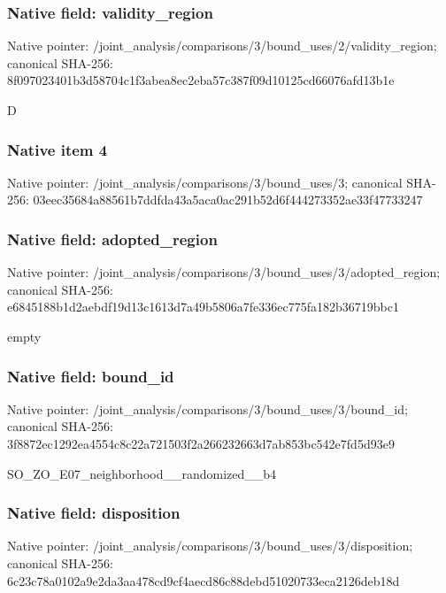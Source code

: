 \documentclass[10pt,a4paper]{article}
\begin{document}
\subsubsection{Native field: validity\_\allowbreak{}region}
Native pointer: /joint\_\allowbreak{}analysis/comparisons/3/bound\_\allowbreak{}uses/2/validity\_\allowbreak{}region; canonical SHA-256: 8f097023401b3d58704c1f3abea8ec2eba57c387f09d10125cd66076afd13b1e

\begingroup\raggedright\sloppy D\par\endgroup

\subsubsection{Native item 4}
Native pointer: /joint\_\allowbreak{}analysis/comparisons/3/bound\_\allowbreak{}uses/3; canonical SHA-256: 03eec35684a88561b7ddfda43a5aca0ac291b52d6f444273352ae33f47733247

\subsubsection{Native field: adopted\_\allowbreak{}region}
Native pointer: /joint\_\allowbreak{}analysis/comparisons/3/bound\_\allowbreak{}uses/3/adopted\_\allowbreak{}region; canonical SHA-256: e6845188b1d2aebdf19d13c1613d7a49b5806a7fe336ec775fa182b36719bbc1

\begingroup\raggedright\sloppy empty\par\endgroup

\subsubsection{Native field: bound\_\allowbreak{}id}
Native pointer: /joint\_\allowbreak{}analysis/comparisons/3/bound\_\allowbreak{}uses/3/bound\_\allowbreak{}id; canonical SHA-256: 3f8872ec1292ea4554c8c22a721503f2a266232663d7ab853bc542e7fd5d93e9

\begingroup\raggedright\sloppy SO\_\allowbreak{}ZO\_\allowbreak{}E07\_\allowbreak{}neighborhood\_\allowbreak{}\_\allowbreak{}randomized\_\allowbreak{}\_\allowbreak{}b4\par\endgroup

\subsubsection{Native field: disposition}
Native pointer: /joint\_\allowbreak{}analysis/comparisons/3/bound\_\allowbreak{}uses/3/disposition; canonical SHA-256: 6c23c78a0102a9e2da3aa478cd9cf4aecd86c88debd51020733eca2126deb18d
\end{document}
